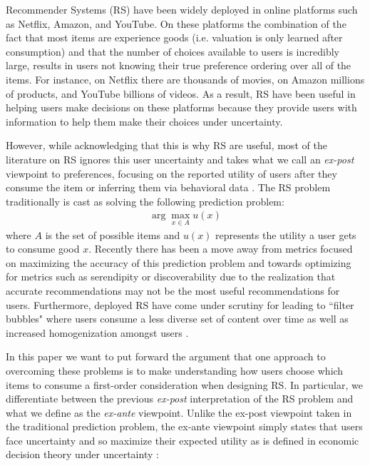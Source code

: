 \documentclass[sigconf]{acmart}
\begin{document}
Recommender Systems (RS) have been widely deployed in online platforms such as Netflix, Amazon, and YouTube. On these platforms the combination of the fact that most items are experience goods (i.e. valuation is only learned after consumption) and that the number of choices available to users is incredibly large, results in users not knowing their true preference ordering over all of the items. For instance, on Netflix there are thousands of movies, on Amazon millions of products, and YouTube billions of videos. As a result, RS have been useful in helping users make decisions on these platforms because they provide users with information to help them make their choices under uncertainty. 
\par
However, while acknowledging that this is why RS are useful, most of the literature on RS ignores this user uncertainty and takes what we call an \textit{ex-post} viewpoint to preferences, focusing on the reported utility of users after they consume the item or inferring them via behavioral data \cite{adomavicius2005toward, zhao2018interpreting}. The RS problem traditionally is cast as solving the following prediction problem:
\begin{align*}
\arg\max\limits_{x \in A} u(x)
\end{align*}
\noindent where $A$ is the set of possible items and $u(x)$ represents the utility a user gets to consume good $x$. Recently there has been a move away from metrics focused on maximizing the accuracy of this prediction problem and towards optimizing for metrics such as serendipity or discoverability \cite{mcnee2006being, vargas2011rank} due to  the realization that accurate recommendations may not be the most useful recommendations for users. Furthermore, deployed RS have come under scrutiny for leading to ``filter bubbles" \cite{pariser2011filter} where users consume a less diverse set of content over time as well as increased homogenization amongst users \cite{chaney2018algorithmic, hosanagar2013will}.
\par
In this paper we want to put forward the argument that one approach to overcoming these problems is to make understanding how users choose which items to consume a first-order consideration when designing RS. In particular, we differentiate between the previous \textit{ex-post} interpretation of the RS problem and what we define as the \textit{ex-ante} viewpoint. Unlike the ex-post viewpoint taken in the traditional prediction problem, the ex-ante viewpoint simply states that users face uncertainty and so maximize their expected utility as is defined in economic decision theory under uncertainty \citep[see e.g.][]{mas1995microeconomic}:
\end{document}
